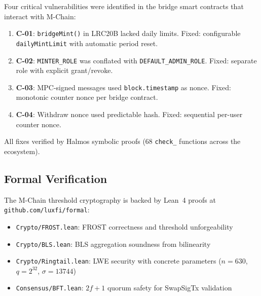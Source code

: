 Four critical vulnerabilities were identified in the bridge smart contracts that interact with M-Chain:

\begin{enumerate}
\item \textbf{C-01}: \texttt{bridgeMint()} in LRC20B lacked daily limits. Fixed: configurable \texttt{dailyMintLimit} with automatic period reset.
\item \textbf{C-02}: \texttt{MINTER\_ROLE} was conflated with \texttt{DEFAULT\_ADMIN\_ROLE}. Fixed: separate role with explicit grant/revoke.
\item \textbf{C-03}: MPC-signed messages used \texttt{block.timestamp} as nonce. Fixed: monotonic counter nonce per bridge contract.
\item \textbf{C-04}: Withdraw nonce used predictable hash. Fixed: sequential per-user counter nonce.
\end{enumerate}

All fixes verified by Halmos symbolic proofs (68 \texttt{check\_} functions across the ecosystem).

\subsection{Formal Verification}

The M-Chain threshold cryptography is backed by Lean~4 proofs at \texttt{github.com/luxfi/formal}:
\begin{itemize}
\item \texttt{Crypto/FROST.lean}: FROST correctness and threshold unforgeability
\item \texttt{Crypto/BLS.lean}: BLS aggregation soundness from bilinearity
\item \texttt{Crypto/Ringtail.lean}: LWE security with concrete parameters ($n=630$, $q=2^{32}$, $\sigma=13744$)
\item \texttt{Consensus/BFT.lean}: $2f+1$ quorum safety for SwapSigTx validation
\end{itemize}

